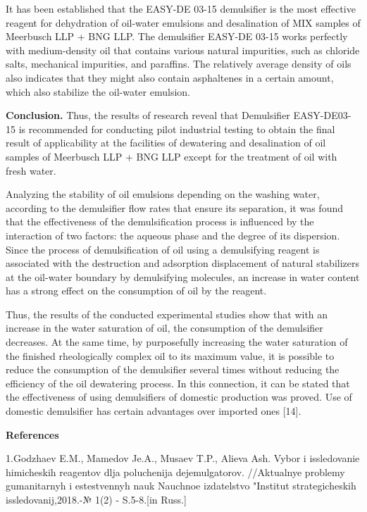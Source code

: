 It has been established that the EASY-DE 03-15 demulsifier is the most
effective reagent for dehydration of oil-water emulsions and
desalination of MIX samples of Meerbusch LLP + BNG LLP. The demulsifier
EASY-DE 03-15 works perfectly with medium-density oil that contains
various natural impurities, such as chloride salts, mechanical
impurities, and paraffins. The relatively average density of oils also
indicates that they might also contain asphaltenes in a certain amount,
which also stabilize the oil-water emulsion.

{\bfseries Conclusion.} Thus, the results of research reveal that
Demulsifier EASY-DE03-15 is recommended for conducting pilot industrial
testing to obtain the final result of applicability at the facilities of
dewatering and desalination of oil samples of Meerbusch LLP + BNG LLP
except for the treatment of oil with fresh water.

Analyzing the stability of oil emulsions depending on the washing water,
according to the demulsifier flow rates that ensure its separation, it
was found that the effectiveness of the demulsification process is
influenced by the interaction of two factors: the aqueous phase and the
degree of its dispersion. Since the process of demulsification of oil
using a demulsifying reagent is associated with the destruction and
adsorption displacement of natural stabilizers at the oil-water boundary
by demulsifying molecules, an increase in water content has a strong
effect on the consumption of oil by the reagent.

Thus, the results of the conducted experimental studies show that with
an increase in the water saturation of oil, the consumption of the
demulsifier decreases. At the same time, by purposefully increasing the
water saturation of the finished rheologically complex oil to its
maximum value, it is possible to reduce the consumption of the
demulsifier several times without reducing the efficiency of the oil
dewatering process. In this connection, it can be stated that the
effectiveness of using demulsifiers of domestic production was proved.
Use of domestic demulsifier has certain advantages over imported ones
{[}14{]}.

{\bfseries References}

1.Godzhaev E.M., Mamedov Je.A., Musaev T.P., Alieva Ash. Vybor i
issledovanie himicheskih reagentov dlja poluchenija
dejemul\textquotesingle gatorov. //Aktual\textquotesingle nye problemy
gumanitarnyh i estestvennyh nauk Nauchnoe izdatel\textquotesingle stvo
"Institut strategicheskih issledovanij,2018.-№ 1(2) - S.5-8.{[}in
Russ.{]}

